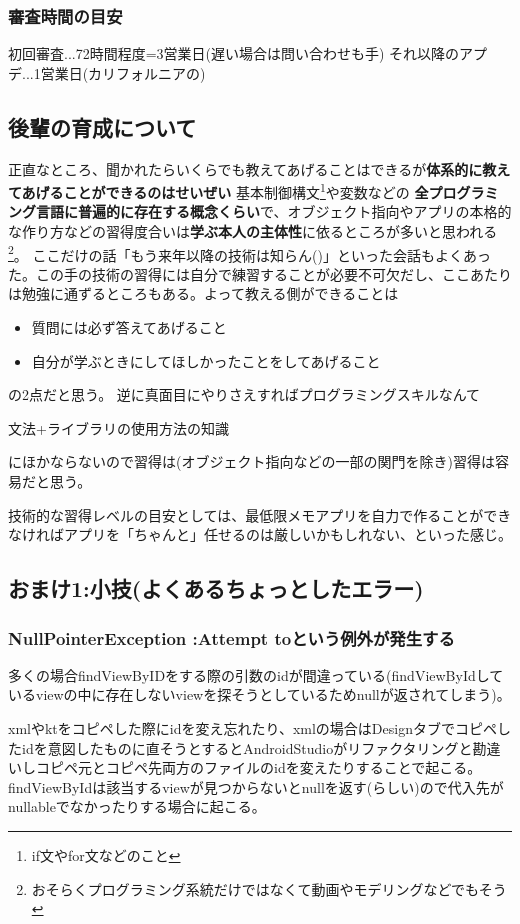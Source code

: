 \documentclass[dvipdfmx,jb5]{jreport}
\begin{document}
\subsubsection{審査時間の目安}
初回審査...72時間程度=3営業日(遅い場合は問い合わせも手)
それ以降のアプデ...1営業日(カリフォルニアの)
\subsection{後輩の育成について}
正直なところ、聞かれたらいくらでも教えてあげることはできるが\textbf{\gtfamily 体系的に教えてあげることができるのはせいぜい} 基本制御構文\footnote{if文やfor文などのこと}や変数などの
\textbf{\gtfamily 全プログラミング言語に普遍的に存在する概念くらい}で、オブジェクト指向やアプリの本格的な作り方などの習得度合いは\textbf{\gtfamily 学ぶ本人の主体性}に依るところが多いと思われる\footnote{おそらくプログラミング系統だけではなくて動画やモデリングなどでもそう}。
ここだけの話「もう来年以降の技術は知らん()」といった会話もよくあった。この手の技術の習得には自分で練習することが必要不可欠だし、ここあたりは勉強に通ずるところもある。よって教える側ができることは
\begin{itemize}
      \item 質問には必ず答えてあげること
      \item 自分が学ぶときにしてほしかったことをしてあげること
\end{itemize}
の2点だと思う。
逆に真面目にやりさえすればプログラミングスキルなんて\par
文法+ライブラリの使用方法の知識\par
にほかならないので習得は(オブジェクト指向などの一部の関門を除き)習得は容易だと思う。\par
技術的な習得レベルの目安としては、最低限メモアプリを自力で作ることができなければアプリを「ちゃんと」任せるのは厳しいかもしれない、といった感じ。
\subsection{おまけ1:小技(よくあるちょっとしたエラー)}
\subsubsection{NullPointerException :Attempt toという例外が発生する}
多くの場合findViewByIDをする際の引数のidが間違っている(findViewByIdしているviewの中に存在しないviewを探そうとしているためnullが返されてしまう)。\par
xmlやktをコピペした際にidを変え忘れたり、xmlの場合はDesignタブでコピペしたidを意図したものに直そうとするとAndroidStudioがリファクタリングと勘違いしコピペ元とコピペ先両方のファイルのidを変えたりすることで起こる。findViewByIdは該当するviewが見つからないとnullを返す(らしい)ので代入先がnullableでなかったりする場合に起こる。
\end{document}
